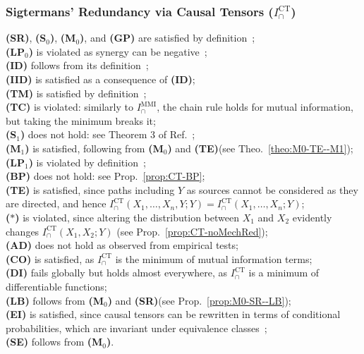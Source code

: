 \documentclass{article}
\newcommand{\ts}[1]{\ensuremath{_{\text{#1}}}}
\newcommand{\Xs}{X_1,\ldots,X_n}
\newcommand{\SR}{\textbf{(SR)}\xspace} %
\newcommand{\Sz}{\textbf{(S\ts{0})}\xspace} %
\newcommand{\Mz}{\textbf{(M\ts{0})}\xspace} %
\newcommand{\GP}{\textbf{(GP)}\xspace} %
\newcommand{\LPz}{\textbf{(LP\ts{0})}\xspace} %
\newcommand{\ID}{\textbf{(ID)}\xspace} %
\newcommand{\IID}{\textbf{(IID)}\xspace} %
\newcommand{\TM}{\textbf{(TM)}\xspace} %
\newcommand{\TC}{\textbf{(TC)}\xspace} %
\newcommand{\So}{\textbf{(S\ts{1})}\xspace} %
\newcommand{\Mo}{\textbf{(M\ts{1})}\xspace} %
\newcommand{\LPo}{\textbf{(LP\ts{1})}\xspace} %
\newcommand{\BP}{\textbf{(BP)}\xspace} %
\newcommand{\TE}{\textbf{(TE)}\xspace} %
\newcommand{\AST}{\textbf{($\boldsymbol{\ast}$)}\xspace} %
\newcommand{\AD}{\textbf{(AD)}\xspace} %
\newcommand{\CO}{\textbf{(CO)}\xspace} %
\newcommand{\LB}{\textbf{(LB)}\xspace} %
\newcommand{\EI}{\textbf{(EI)}\xspace} %
\newcommand{\SE}{\textbf{(SE)}\xspace} %
\newcommand{\DI}{\textbf{(DI)}\xspace}
\newcommand{\IMMI}{\ensuremath{I_\cap^{\text{MMI}}}\xspace}
\newcommand{\ICT}{\ensuremath{I_\cap^{\text{CT}}}\xspace}
\begin{document}
\subsubsection*{Sigtermans' Redundancy via Causal Tensors ($\ICT$)}
    \SR, \Sz, \Mz, and \GP are satisfied by definition~\cite{sigtermans2020partial}; \\
    \LPz is violated as synergy can be negative~\cite{sigtermans2020partial}; \\
    \ID follows from its definition~\cite{sigtermans2020partial}; \\
    \IID is satisfied as a consequence of \ID; \\
    \TM is satisfied by definition~\cite{sigtermans2020partial}; \\
    \TC is violated: similarly to \IMMI, the chain rule holds for mutual information, but taking the minimum breaks it; \\
    \So does not hold: see Theorem 3 of Ref.~\cite{sigtermans2020partial}; \\
    \Mo is satisfied, following from \Mz and \TE (see Theo.~\ref{theo:M0-TE--M1}); \\
    \LPo is violated by definition~\cite{sigtermans2020partial}; \\
    \BP does not hold: see Prop.~\ref{prop:CT-BP}; \\
    \TE is satisfied, since paths including $Y$ as sources cannot be considered as they are directed, and hence $\ICT(\Xs,Y;Y)=\ICT(\Xs;Y)$; \\
    \AST is violated, since altering the distribution between $X_1$ and $X_2$ evidently changes $\ICT(X_1,X_2;Y)$ (see Prop.~\ref{prop:CT-noMechRed}); \\
    \AD does not hold as observed from empirical tests; \\
    \CO is satisfied, as \ICT is the minimum of mutual information terms; \\
    \DI fails globally but holds almost everywhere, as \ICT is a minimum of differentiable functions; \\  
    \LB follows from \Mz and \SR (see Prop.~\ref{prop:M0-SR--LB}); \\
    \EI is satisfied, since causal tensors can be rewritten in terms of conditional probabilities, which are invariant under equivalence classes~\cite{li2011connection}; \\
    \SE follows from \Mz. 
\end{document}
